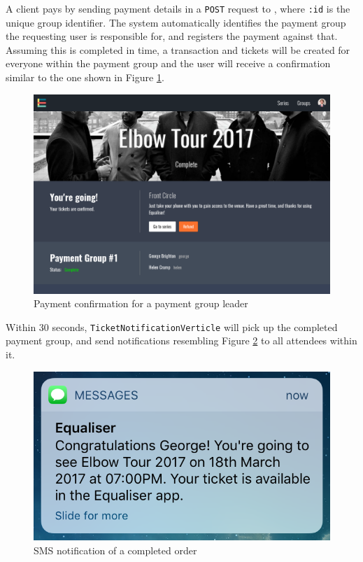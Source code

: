 \documentclass[12pt,a4paper]{bhamdissertation}
\newcommand{\code}[1]{\texttt{#1}}
\begin{document}
A client pays by sending payment details in a \code{POST} request to \code{}, where \code{:id} is the unique group identifier. The system automatically identifies the payment group the requesting user is responsible for, and registers the payment against that. Assuming this is completed in time, a transaction and tickets will be created for everyone within the payment group and the user will receive a confirmation similar to the one shown in Figure \ref{img:going}.

\begin{figure}[!htbp]
    \centering
    \includegraphics[width=1\linewidth]{img/going.png}
    \caption{Payment confirmation for a payment group leader}
    \label{img:going}
\end{figure}

Within 30 seconds, \code{TicketNotificationVerticle} will pick up the completed payment group, and send notifications resembling Figure \ref{img:ticket_confirmation} to all attendees within it.

\begin{figure}[!htbp]
    \centering
    \includegraphics[width=.5\linewidth]{img/ticket_confirmation.png}
    \caption{SMS notification of a completed order}
    \label{img:ticket_confirmation}
\end{figure}
\end{document}
